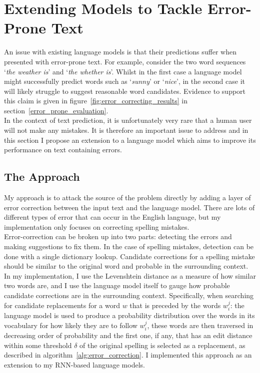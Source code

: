\documentclass[a4paper, 12pt]{report}
\newcommand{\tit}[1]{\textit{#1}}
\begin{document}
\section{Extending Models to Tackle Error-Prone Text} \label{error_correcting_lm}

An issue with existing language models is that their predictions suffer when presented with error-prone text. For example, consider the two word sequences `\tit{the weather is}' and `\tit{the whether is}'. Whilst in the first case a language model might successfully predict words such as `\tit{sunny}' or `\tit{nice}', in the second case it will likely struggle to suggest reasonable word candidates. Evidence to support this claim is given in figure~\ref{fig:error_correcting_results} in section~\ref{error_prone_evaluation}. \\

In the context of text prediction, it is unfortunately very rare that a human user will not make any mistakes. It is therefore an important issue to address and in this section I propose an extension to a language model which aims to improve its performance on text containing errors.

\subsection{The Approach}

My approach is to attack the source of the problem directly by adding a layer of error correction between the input text and the language model. There are lots of different types of error that can occur in the English language, but my implementation only focuses on correcting spelling mistakes. \\

Error-correction can be broken up into two parts: detecting the errors and making suggestions to fix them. In the case of spelling mistakes, detection can be done with a single dictionary lookup. Candidate corrections for a spelling mistake should be similar to the original word and probable in the surrounding context. In my implementation, I use the Levenshtein distance as a measure of how similar two words are, and I use the language model itself to gauge how probable candidate corrections are in the surrounding context. Specifically, when searching for candidate replacements for a word $w$ that is preceded by the words $w_i^j$: the language model is used to produce a probability distribution over the words in its vocabulary for how likely they are to follow $w_i^j$, these words are then traversed in decreasing order of probability and the first one, if any, that has an edit distance within some threshold $\delta$ of the original spelling is selected as a replacement, as described in algorithm~\ref{alg:error_correction}. I implemented this approach as an extension to my RNN-based language models.
\end{document}
